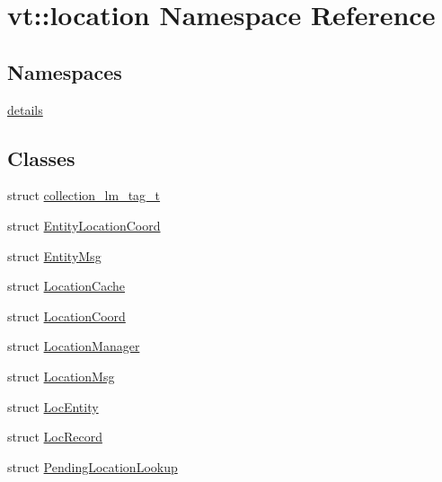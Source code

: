 \hypertarget{namespacevt_1_1location}{}\section{vt\+:\+:location Namespace Reference}
\label{namespacevt_1_1location}
\subsection*{Namespaces}
\begin{DoxyCompactItemize}
\item 
 \hyperlink{namespacevt_1_1location_1_1details}{details}
\end{DoxyCompactItemize}
\subsection*{Classes}
\begin{DoxyCompactItemize}
\item 
struct \hyperlink{structvt_1_1location_1_1collection__lm__tag__t}{collection\+\_\+lm\+\_\+tag\+\_\+t}
\item 
struct \hyperlink{structvt_1_1location_1_1_entity_location_coord}{Entity\+Location\+Coord}
\item 
struct \hyperlink{structvt_1_1location_1_1_entity_msg}{Entity\+Msg}
\item 
struct \hyperlink{structvt_1_1location_1_1_location_cache}{Location\+Cache}
\item 
struct \hyperlink{structvt_1_1location_1_1_location_coord}{Location\+Coord}
\item 
struct \hyperlink{structvt_1_1location_1_1_location_manager}{Location\+Manager}
\item 
struct \hyperlink{structvt_1_1location_1_1_location_msg}{Location\+Msg}
\item 
struct \hyperlink{structvt_1_1location_1_1_loc_entity}{Loc\+Entity}
\item 
struct \hyperlink{structvt_1_1location_1_1_loc_record}{Loc\+Record}
\item 
struct \hyperlink{structvt_1_1location_1_1_pending_location_lookup}{Pending\+Location\+Lookup}
\end{DoxyCompactItemize}
